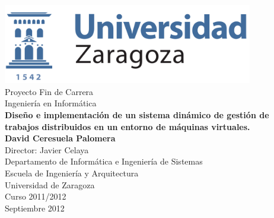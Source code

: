 \documentclass[11pt, twoside]{book}
\makeatletter
\def\cleardoublepageempty{\clearpage\if@twoside \ifodd\c@page\else
    \hbox{}
    \thispagestyle{empty}
    \newpage
    \if@twocolumn\hbox{}\newpage\fi\fi\fi}
\def\bibname{Bibliografía}
\def\listtablename{Índice de tablas}
\makeatother
\begin{document}

\renewcommand{\listtablename}{Índice de tablas}
\renewcommand{\bibname}{Bibliografía}

\begin{titlepage} 
\begin{center} 
 
\includegraphics*[height=3.5cm]{imagenes/logo.png}\\ 

\vspace*{1.5cm} 
{\large Proyecto Fin de Carrera}\\ 
\vspace*{0.2cm} 
{\large Ingeniería en Informática}\\ 
\vspace*{1.5cm} 
{\huge \textbf{Diseño e implementación de un sistema dinámico de gestión de trabajos distribuidos en un entorno de máquinas virtuales.\\}}
\vspace*{2cm} 
{\Large \textbf{David Ceresuela Palomera\\}}
\vspace*{2cm} 
{\normalsize Director: Javier Celaya}\\ 
\vspace*{1.5cm} 
{\normalsize Departamento de Informática e Ingeniería de Sistemas}\\ 
{Escuela de Ingeniería y Arquitectura}\\ 
{Universidad de Zaragoza}\\ 
\vspace*{3.5cm} 
{\normalsize Curso 2011/2012}\\ 
{\normalsize Septiembre 2012}\\ 
\end{center} 
\end{titlepage} 

\cleardoublepageempty


\frontmatter %


\end{document}
